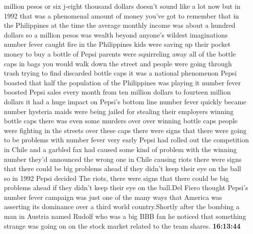 \documentclass{article}%
\begin{document}
million pesos or six j{-}eight thousand dollars doesn't sound like a lot now but in 1992 that was a phenomenal amount of money you've got to remember that in the Philippines at the time the average monthly income was about a hundred dollars so a million pesos was wealth beyond anyone's wildest imaginations number fever caught fire in the Philippines kids were saving up their pocket money to buy a bottle of Pepsi parents were squirreling away all of the bottle caps in bags you would walk down the street and people were going through trash trying to find discarded bottle caps it was a national phenomenon Pepsi boasted that half the population of the Philippines was playing it number fever boosted Pepsi sales every month from ten million dollars to fourteen million dollars it had a huge impact on Pepsi's bottom line number fever quickly became number hysteria maids were being jailed for stealing their employers winning bottle caps there was even some murders over over winning bottle caps people were fighting in the streets over these caps there were signs that there were going to be problems with number fever very early Pepsi had rolled out the competition in Chile and a garbled fax had caused some kind of problem with the winning number they'd announced the wrong one in Chile causing riots there were signs that there could be big problems ahead if they didn't keep their eye on the ball so in 1992 Pepsi decided  The riots, there were signs that there could be big problems ahead if they didn't keep their eye on the ball.Del Fiero thought Pepsi's number fever campaign was just one of the many ways that America was asserting its dominance over a third world country.Shortly after the bombing a man in Austria named Rudolf who was a big BBB fan he noticed that something strange was going on on the stock market related to the team shares.%
\textbf{16:13:44}%
\newline%
\end{document}

